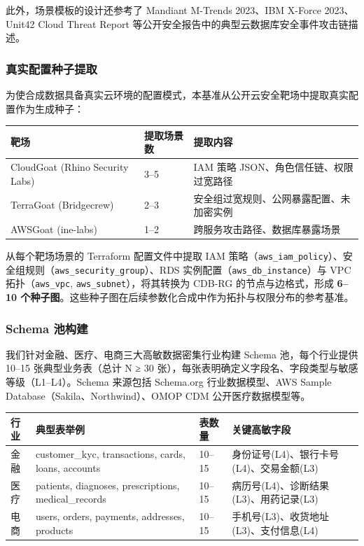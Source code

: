 \documentclass[a4paper,12pt]{ctexart}
\begin{document}
此外，场景模板的设计还参考了 Mandiant M-Trends 2023、IBM X-Force 2023、Unit42 Cloud Threat Report 等公开安全报告中的典型云数据库安全事件攻击链描述。

\subsubsection{真实配置种子提取}

为使合成数据具备真实云环境的配置模式，本基准从公开云安全靶场中提取真实配置作为生成种子：

\begin{table}[htbp]
\centering
\small
\setlength{\tabcolsep}{4pt}
\begin{tabular}{|l|l|l|}
\hline
\textbf{靶场} & \textbf{提取场景数} & \textbf{提取内容} \\
\hline
CloudGoat (Rhino Security Labs) & 3–5 & IAM 策略 JSON、角色信任链、权限过宽路径 \\
\hline
TerraGoat (Bridgecrew) & 2–3 & 安全组过宽规则、公网暴露配置、未加密实例 \\
\hline
AWSGoat (ine-labs) & 1–2 & 跨服务攻击路径、数据库暴露场景 \\
\hline
\end{tabular}
\end{table}

从每个靶场场景的 Terraform 配置文件中提取 IAM 策略（\texttt{aws\_iam\_policy}）、安全组规则（\texttt{aws\_security\_group}）、RDS 实例配置（\texttt{aws\_db\_instance}）与 VPC 拓扑（\texttt{aws\_vpc}, \texttt{aws\_subnet}），将其转换为 CDB-RG 的节点与边格式，形成 \textbf{6–10 个种子图}。这些种子图在后续参数化合成中作为拓扑与权限分布的参考基准。

\subsubsection{Schema 池构建}

我们针对金融、医疗、电商三大高敏数据密集行业构建 Schema 池，每个行业提供 10–15 张典型业务表（总计 N ≥ 30 张），每张表明确定义字段名、字段类型与敏感等级（L1–L4）。Schema 来源包括 Schema.org 行业数据模型、AWS Sample Database（Sakila、Northwind）、OMOP CDM 公开医疗数据模型等。

\begin{table}[htbp]
\centering
\small
\setlength{\tabcolsep}{4pt}
\begin{tabular}{|l|l|l|l|}
\hline
\textbf{行业} & \textbf{典型表举例} & \textbf{表数量} & \textbf{关键高敏字段} \\
\hline
金融 & customer\_kyc, transactions, cards, loans, accounts & 10–15 & 身份证号(L4)、银行卡号(L4)、交易金额(L3) \\
\hline
医疗 & patients, diagnoses, prescriptions, medical\_records & 10–15 & 病历号(L4)、诊断结果(L3)、用药记录(L3) \\
\hline
电商 & users, orders, payments, addresses, products & 10–15 & 手机号(L3)、收货地址(L3)、支付信息(L4) \\
\hline
\end{tabular}
\end{table}
\end{document}
